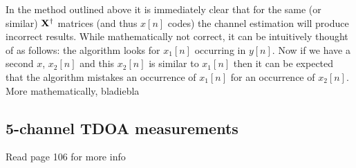 \documentclass[11pt,titlepage]{report}
\begin{document}
In the method outlined above it is immediately clear that for the same (or similar) $\mathbf{X}^\dagger$ matrices (and thus $x[n]$ codes) the channel estimation will produce incorrect results. While mathematically not correct, it can be intuitively thought of as follows: the algorithm looks for $x_1[n]$ occurring in $y[n]$. Now if we have a second $x$, $x_2[n]$ and this $x_2[n]$ is similar to $x_1[n]$ then it can be expected that the algorithm mistakes an occurrence of $x_1[n]$ for an occurrence of $x_2[n]$. More mathematically, bladiebla

\subsection{5-channel TDOA measurements}
Read page 106 for more info
\end{document}
